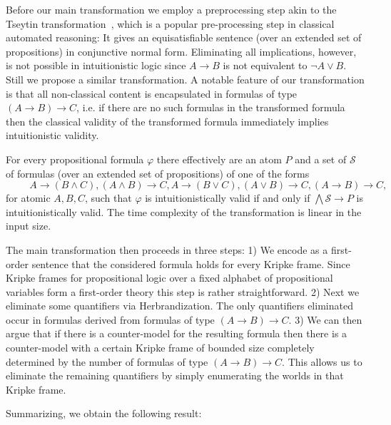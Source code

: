 \documentclass[runningheads]{llncs}
\begin{document}
Before our main transformation we employ a preprocessing step akin to the Tseytin transformation~\cite{tseitin1983complexity}, which is a popular pre-processing step in classical automated reasoning:
It gives an equisatisfiable sentence (over an extended set of propositions) in conjunctive normal form.
Eliminating all implications, however, is not possible in intuitionistic logic since $A\to B$ is not equivalent to $\neg A\vee B$.
Still we propose a similar transformation.
A notable feature of our transformation is that all non-classical content is encapsulated in formulas of type $(A\to B)\to C$, i.e. if there are no such formulas in the transformed formula then the classical validity of the transformed formula immediately implies intuitionistic validity.

\begin{theorem}\label{thm:Tseytin}
For every propositional formula $\varphi$ there effectively are an atom $P$ and a set of $\mathcal S$ of formulas (over an extended set of propositions) of one of the forms\\
$\hspace{1cm} A\to (B\wedge C), (A\wedge B)\to C, A\to (B\vee C), (A\vee B)\to C, (A\to B)\to C,$\\
for atomic $A, B, C$, such that $\varphi$ is intuitionistically valid if and only if $\bigwedge\mathcal S\to P$ is intuitionistically valid. The time complexity of the transformation is linear in the input size.
\end{theorem}

The main transformation then proceeds in three steps:
%
1) We encode as a first-order sentence that the considered formula holds for every Kripke frame.
Since Kripke frames for propositional logic over a fixed alphabet of propositional variables form a first-order theory this step is rather straightforward.
%
2) Next we eliminate some quantifiers via Herbrandization. The only quantifiers eliminated occur in formulas derived from formulas of type $(A\to B)\to C$.
%
3) We can then argue that if there is a counter-model for the resulting formula then there is a counter-model with a certain Kripke frame of bounded size completely determined by the number of formulas of type $(A\to B)\to C$.
This allows us to eliminate the remaining quantifiers by simply enumerating the worlds in that Kripke frame.

Summarizing, we obtain the following result:
\end{document}
